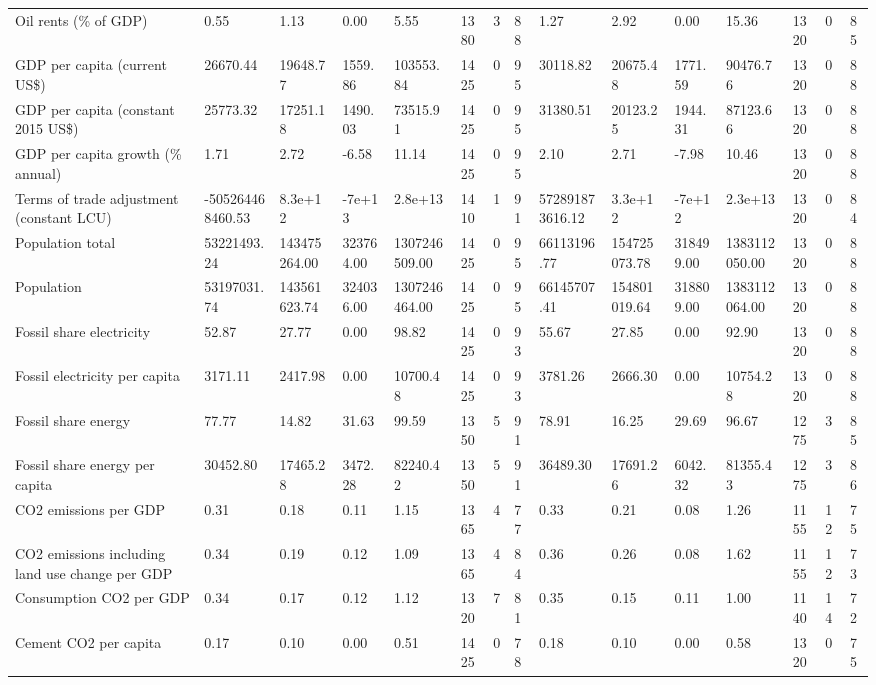 \begin{longtable}{lllllllllllllll}
Oil rents (\% of GDP) & 0.55 & 1.13 & 0.00 & 5.55 & 1380 & 3 & 88 & 1.27 & 2.92 & 0.00 & 15.36 & 1320 & 0 & 85\\
GDP per capita (current US\$) & 26670.44 & 19648.77 & 1559.86 & 103553.84 & 1425 & 0 & 95 & 30118.82 & 20675.48 & 1771.59 & 90476.76 & 1320 & 0 & 88\\
GDP per capita (constant 2015 US\$) & 25773.32 & 17251.18 & 1490.03 & 73515.91 & 1425 & 0 & 95 & 31380.51 & 20123.25 & 1944.31 & 87123.66 & 1320 & 0 & 88\\
GDP per capita growth (\% annual) & 1.71 & 2.72 & -6.58 & 11.14 & 1425 & 0 & 95 & 2.10 & 2.71 & -7.98 & 10.46 & 1320 & 0 & 88\\
\addlinespace
Terms of trade adjustment (constant LCU) & -505264468460.53 & 8.3e+12 & -7e+13 & 2.8e+13 & 1410 & 1 & 91 & 572891873616.12 & 3.3e+12 & -7e+12 & 2.3e+13 & 1320 & 0 & 84\\
Population total & 53221493.24 & 143475264.00 & 323764.00 & 1307246509.00 & 1425 & 0 & 95 & 66113196.77 & 154725073.78 & 318499.00 & 1383112050.00 & 1320 & 0 & 88\\
Population & 53197031.74 & 143561623.74 & 324036.00 & 1307246464.00 & 1425 & 0 & 95 & 66145707.41 & 154801019.64 & 318809.00 & 1383112064.00 & 1320 & 0 & 88\\
Fossil share electricity & 52.87 & 27.77 & 0.00 & 98.82 & 1425 & 0 & 93 & 55.67 & 27.85 & 0.00 & 92.90 & 1320 & 0 & 88\\
Fossil electricity per capita & 3171.11 & 2417.98 & 0.00 & 10700.48 & 1425 & 0 & 93 & 3781.26 & 2666.30 & 0.00 & 10754.28 & 1320 & 0 & 88\\
\addlinespace
Fossil share energy & 77.77 & 14.82 & 31.63 & 99.59 & 1350 & 5 & 91 & 78.91 & 16.25 & 29.69 & 96.67 & 1275 & 3 & 85\\
Fossil share energy per capita & 30452.80 & 17465.28 & 3472.28 & 82240.42 & 1350 & 5 & 91 & 36489.30 & 17691.26 & 6042.32 & 81355.43 & 1275 & 3 & 86\\
CO2 emissions per GDP & 0.31 & 0.18 & 0.11 & 1.15 & 1365 & 4 & 77 & 0.33 & 0.21 & 0.08 & 1.26 & 1155 & 12 & 75\\
CO2 emissions including land use change per GDP & 0.34 & 0.19 & 0.12 & 1.09 & 1365 & 4 & 84 & 0.36 & 0.26 & 0.08 & 1.62 & 1155 & 12 & 73\\
Consumption CO2 per GDP & 0.34 & 0.17 & 0.12 & 1.12 & 1320 & 7 & 81 & 0.35 & 0.15 & 0.11 & 1.00 & 1140 & 14 & 72\\
\addlinespace
Cement CO2 per capita & 0.17 & 0.10 & 0.00 & 0.51 & 1425 & 0 & 78 & 0.18 & 0.10 & 0.00 & 0.58 & 1320 & 0 & 75\\

\end{longtable}
